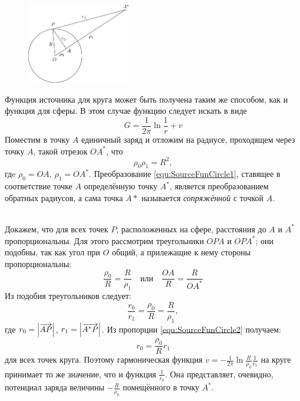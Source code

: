 \begin{figure}
	\centering
	\includegraphics[width=0.4\textwidth]{figSourceFunctionCircle.pdf}
\end{figure}
\begin{minipage}[t]{0.55\textwidth}
Функция источника для круга может быть получена таким же способом, как и функция для сферы. В этом случае функцию следует искать в виде
\begin{equation}
	G = \frac{1}{2 \pi} \ln \frac{1}{r} + v
	\label{equ:equSourceFunCircle}
\end{equation}
Поместим в точку $A$ единичный заряд и отложим на радиусе, проходящем через точку $A$, такой отрезок $OA^*$, что
\begin{equation}
	\rho_0\rho_1 = R^2,
	\label{equ:SourceFunCircle1}
\end{equation}
гдe $\rho_0 = OA$, $\rho_1 = OA^*$.
Преобразование \eqref{equ:SourceFunCircle1}, ставящее в соответствие точке $A$ определённую точку $A^*$, является преобразованием обратных радиусов, а сама точка $A*$ называется \textit{сопряжённой} с точкой $A$. 
\end{minipage}\\
Докажем, что для всех точек $P$, расположенных на сфере, расстояния до $A$ и $A^*$ пропорциональны.  Для этого рассмотрим треугольники $OPA$ и $OPA^*$; они подобны, так как угол при $O$ общий, а прилежащие к нему стороны пропорциональны:
\[
	\frac{\rho_0}{R}=\frac{R}{\rho_1} \quad \mbox{или} \quad \frac{OA}{R} = \frac{R}{OA^*}
\]
Из подобия треугольников следует:
\begin{equation}
	\frac{r_0}{r_1} = \frac{\rho_0}{R} = \frac{R}{\rho_1},
	\label{equ:SourceFunCircle2}
\end{equation}
где $r_0 = \left | \overrightarrow{AP} \right |$, $r_1 = \left | \overrightarrow{A^*P} \right |$. Из пропорции \eqref{equ:SourceFunCircle2} получаем:
\[
	r_0 = \frac{\rho_0}{R} r_1
\]
для всех точек круга. Поэтому гармоническая функция $v = - \frac{1}{2 \pi} \ln \frac{R}{\rho_0} \frac{1}{r_1}$ на круге принимает то же значение, что и функция $\frac{1}{r_0}$. Она представляет, очевидно, потенциал заряда величины $- \frac{R}{\rho_0}$ помещённого в точку $A^*$.

